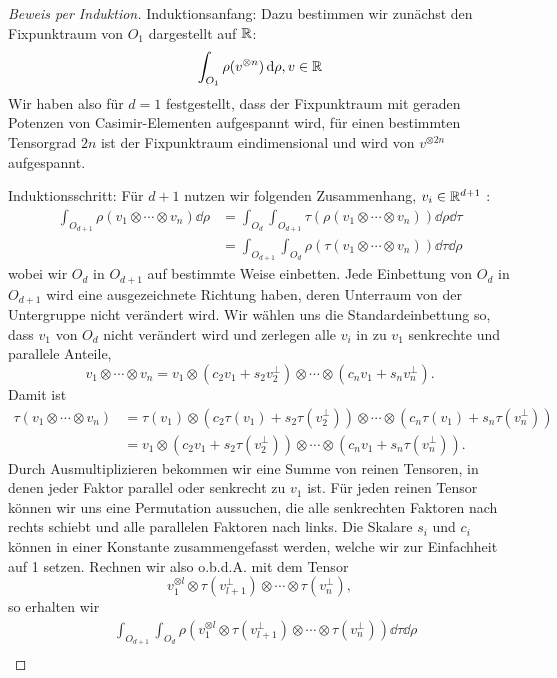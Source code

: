 \begin{proof}[Beweis per Induktion]
Induktionsanfang:
Dazu bestimmen wir zunächst den Fixpunktraum von $O_1$ dargestellt auf $\mathbb{R}$:
\[
\int_{O_1} \rho (v^{\otimes n}) \,\textrm{d} \rho, v\in\mathbb{R}
\]
Wir haben also für $d=1$ festgestellt, dass der Fixpunktraum mit geraden Potenzen von Casimir-Elementen aufgespannt wird, für einen bestimmten Tensorgrad $2n$ ist der Fixpunktraum eindimensional und wird von $v^{\otimes 2n}$ aufgespannt.

Induktionsschritt: 
Für $d+1$ nutzen wir folgenden Zusammenhang, $ v_i\in\mathbb{R}^{d+1}$ :
\begin{align*}
\int_{O_{d+1}} \rho (v_1\otimes\cdots \otimes v_n) \dd \rho &= \int_{O_{d}} \int_{O_{d+1}} \tau(\rho (v_1\otimes\cdots \otimes v_n)) \dd \rho \dd \tau \\
&=  \int_{O_{d+1}} \int_{O_{d}} \rho(\tau (v_1\otimes\cdots \otimes v_n)) \dd \tau \dd \rho
\end{align*}
wobei wir $O_d$ in $O_{d+1}$ auf bestimmte Weise einbetten. 
Jede Einbettung von $O_d$ in $O_{d+1}$ wird eine ausgezeichnete Richtung haben, deren Unterraum von der Untergruppe nicht verändert wird. Wir wählen uns die Standardeinbettung so, dass $v_1$ von $O_d$ nicht verändert wird und zerlegen alle $v_i$ in zu $v_1$ senkrechte und parallele Anteile,
\[
v_1\otimes\cdots \otimes v_n = v_1 \otimes (c_2 v_1 + s_2 v_2^\perp)\otimes \cdots \otimes (c_n v_1 + s_n v_n^\perp) .
\]
Damit ist
\begin{align*}
\tau(v_1\otimes\cdots \otimes v_n) &= \tau(v_1) \otimes (c_2 \tau(v_1) + s_2 \tau( v_2^\perp))\otimes \cdots \otimes (c_n \tau(v_1) + s_n \tau(v_n^\perp)) \\
&= v_1 \otimes (c_2 v_1 + s_2 \tau(v_2^\perp))\otimes \cdots \otimes (c_n v_1 + s_n \tau(v_n^\perp)) .
\end{align*}
Durch Ausmultiplizieren bekommen wir eine Summe von reinen Tensoren, in denen jeder Faktor parallel oder senkrecht zu $v_1$ ist. Für jeden reinen Tensor können wir uns eine Permutation aussuchen, die alle senkrechten Faktoren nach rechts schiebt und alle parallelen Faktoren nach links. Die Skalare $s_i$ und $c_i$ können in einer Konstante zusammengefasst werden, welche wir zur Einfachheit auf 1 setzen. Rechnen wir also o.b.d.A. mit dem Tensor
\[
 v_1^{\otimes l} \otimes \tau(v_{l+1}^\perp) \otimes \cdots \otimes \tau(v_n^\perp),
\] 
so erhalten wir
\begin{align*}
	&\int_{O_{d+1}} \int_{O_{d}} \rho\left(v_1^{\otimes l} \otimes \tau(v_{l+1}^\perp) \otimes \cdots \otimes \tau(v_n^\perp)\right) \dd \tau \dd \rho \\

\end{align*}
\end{proof}
